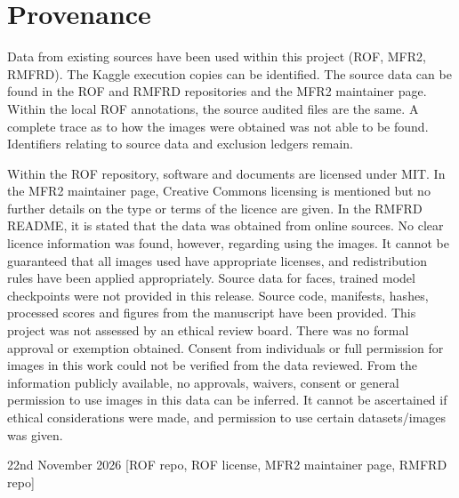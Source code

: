 \section{Provenance}

Data from existing sources have been used within this project (ROF, MFR2, RMFRD). The Kaggle execution copies can be identified. The source data can be found in the ROF and RMFRD repositories and the MFR2 maintainer page. Within the local ROF annotations, the source audited files are the same. A complete trace as to how the images were obtained was not able to be found. Identifiers relating to source data and exclusion ledgers remain.\par

Within the ROF repository, software and documents are licensed under MIT. In the MFR2 maintainer page, Creative Commons licensing is mentioned but no further details on the type or terms of the licence are given. In the RMFRD README, it is stated that the data was obtained from online sources. No clear licence information was found, however, regarding using the images. It cannot be guaranteed that all images used have appropriate licenses, and redistribution rules have been applied appropriately. Source data for faces, trained model checkpoints were not provided in this release. Source code, manifests, hashes, processed scores and figures from the manuscript have been provided. This project was not assessed by an ethical review board. There was no formal approval or exemption obtained. Consent from individuals or full permission for images in this work could not be verified from the data reviewed. From the information publicly available, no approvals, waivers, consent or general permission to use images in this data can be inferred. It cannot be ascertained if ethical considerations were made, and permission to use certain datasets/images was given.\par

22nd November 2026 [ROF repo, ROF license, MFR2 maintainer page, RMFRD repo]\par
